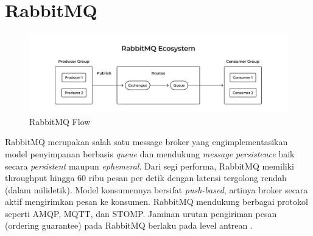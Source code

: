 \section{RabbitMQ}

\begin{figure}[htbp]
    \centering
    \includegraphics[width=1\textwidth]{resources/chapter-2/rabbitmq.jpeg}
    \caption{RabbitMQ Flow \parencite{royNatsRmqKafka}}
    \label{fig:rabbitmq-flow}
\end{figure}

RabbitMQ merupakan salah satu message broker yang engimplementasikan model penyimpanan berbasis \textit{queue} dan mendukung \textit{message persistence} baik secara \textit{persistent} maupun \textit{ephemeral}. Dari segi performa, RabbitMQ memiliki throughput hingga 60 ribu pesan per detik dengan latensi tergolong rendah (dalam milidetik). Model konsumennya bersifat \textit{push-based}, artinya broker secara aktif mengirimkan pesan ke konsumen. RabbitMQ mendukung berbagai protokol seperti AMQP, MQTT, dan STOMP. Jaminan urutan pengiriman pesan (ordering guarantee) pada RabbitMQ berlaku pada level antrean \parencite{arshadChoosingTheRightMessaging}.